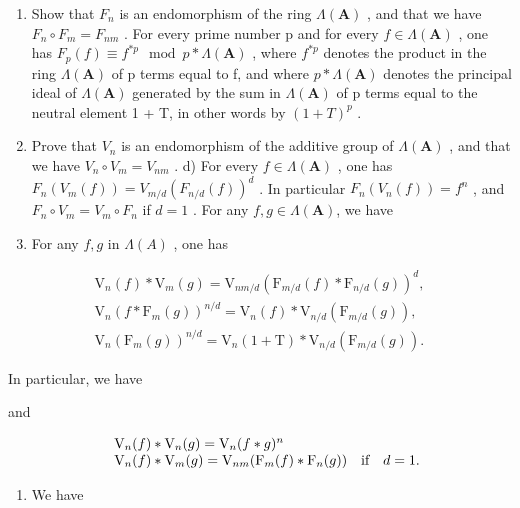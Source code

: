 \begin{enumerate}
\def\labelenumi{\alph{enumi})}
\setcounter{enumi}{1}
\item
  Show that \(F_{n}\) is an endomorphism of the ring \(\Lambda(\mathbf{A})\) , and that we have \(F_{n} \circ F_{m} = F_{nm}\) . For every prime number p and for every \(f \in \Lambda(\mathbf{A})\) , one has \(F_{p}(f) \equiv f^{*p} \mod p * \Lambda(\mathbf{A})\) , where \(f^{*p}\) denotes the product in the ring \(\Lambda(\mathbf{A})\) of p terms equal to f, and where \(p * \Lambda(\mathbf{A})\) denotes the principal ideal of \(\Lambda(\mathbf{A})\) generated by the sum in \(\Lambda(\mathbf{A})\) of p terms equal to the neutral element 1 + T, in other words by \((1 + T)^{p}\) .
\item
  Prove that \(V_{n}\) is an endomorphism of the additive group of \(\Lambda(\mathbf{A})\) , and that we have \(V_{n} \circ V_{m} = V_{nm}\) . d) For every \(f \in \Lambda(\mathbf{A})\) , one has \(F_{n}(V_{m}(f)) = V_{m/d}(F_{n/d}(f))^{d}\) . In particular \(F_{n}(V_{n}(f)) = f^{n}\) , and \(F_{n} \circ V_{m} = V_{m} \circ F_{n}\) if \(d = 1\) . For any \(f,g\in\Lambda(\mathbf{A})\), we have
\item
  For any \(f, g\) in \(\Lambda(A)\) , one has
\end{enumerate}

\[
\begin{array}{l} \mathrm{V} _ {n} (f) * \mathrm{V} _ {m} (g) = \mathrm{V} _ {n m / d} (\mathrm{F} _ {m / d} (f) * \mathrm{F} _ {n / d} (g)) ^ {d}, \\ \mathrm{V} _ {n} (f * \mathrm{F} _ {m} (g)) ^ {n / d} = \mathrm{V} _ {n} (f) * \mathrm{V} _ {n / d} (\mathrm{F} _ {m / d} (g)), \\ \mathrm{V} _ {n} (\mathrm{F} _ {m} (g)) ^ {n / d} = \mathrm{V} _ {n} (1 + \mathrm{T}) * \mathrm{V} _ {n / d} (\mathrm{F} _ {m / d} (g)). \end{array}
\]

In particular, we have

and

\[
\begin{array}{r l} & {\mathrm{V} _ {n} (f) * \mathrm{V} _ {n} (g) = \mathrm{V} _ {n} (f * g) ^ {n}} \\ & {\mathrm{V} _ {n} (f) * \mathrm{V} _ {m} (g) = \mathrm{V} _ {n m} (\mathrm{F} _ {m} (f) * \mathrm{F} _ {n} (g)) \quad \text {if} \quad d = 1.} \end{array}
\]

\begin{enumerate}
\def\labelenumi{\alph{enumi})}
\setcounter{enumi}{5}
\tightlist
\item
  We have
\end{enumerate}

